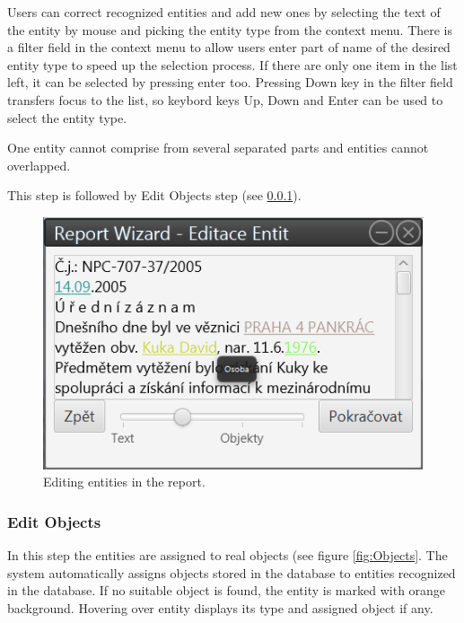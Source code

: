 \documentclass[12pt,a4paper]{report}
\begin{document}
Users can correct recognized entities and add new ones by selecting the text
of the entity by mouse and picking the entity type from the context menu.
There is a filter field in the context menu to allow users enter part of name
of the desired entity type to speed up the selection process. If there are only
one item in the list left, it can be selected by pressing enter too. Pressing
Down key in the filter field transfers focus to the list, so keybord keys Up,
Down and Enter can be used to select the entity type.

One entity cannot comprise from several separated parts and entities cannot
overlapped.

This step is followed by Edit Objects step (see \ref{sssec:EditObjects}).

\begin{figure}[!htb]
        \centering
        \includegraphics[width=\textwidth]{Images/entities}
        \caption{Editing entities in the report.}
        \label{fig:Entities}
\end{figure}

\subsubsection{Edit Objects}
\label{sssec:EditObjects}

In this step the entities are assigned to real objects (see figure
\ref{fig:Objects}. The system automatically assigns objects stored in the
database to entities recognized in the database. If no suitable object is
found, the entity is marked with orange background. Hovering over entity
displays its type and assigned object if any.
\end{document}
